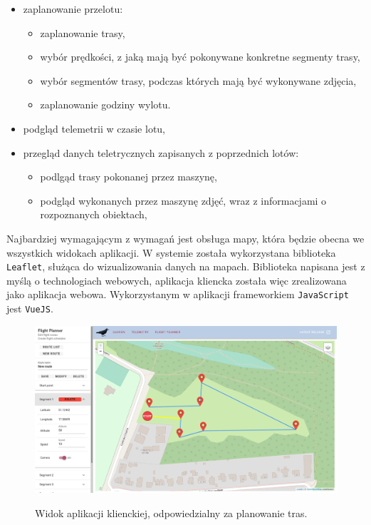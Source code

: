 \begin{itemize}
	\item zaplanowanie przelotu:
	\begin{itemize}
		\item zaplanowanie trasy,
		\item wybór prędkości, z jaką mają być pokonywane konkretne segmenty trasy,
		\item wybór segmentów trasy, podczas których mają być wykonywane zdjęcia,
		\item zaplanowanie godziny wylotu.
	\end{itemize}
	\item podgląd telemetrii w czasie lotu,
	\item przegląd danych teletrycznych zapisanych z poprzednich lotów:
	\begin{itemize}
		\item podlgąd trasy pokonanej przez maszynę,
		\item podgląd wykonanych przez maszynę zdjęć,
				wraz z informacjami o rozpoznanych obiektach,
	\end{itemize} 
\end{itemize}

Najbardziej wymagającym z wymagań jest obsługa mapy, która będzie obecna we wszystkich
widokach aplikacji. W systemie została wykorzystana biblioteka \texttt{Leaflet}, 
służąca do wizualizowania danych na mapach. Biblioteka napisana jest z myślą o technologiach 
webowych, aplikacja kliencka została więc zrealizowana jako aplikacja webowa.
Wykorzystanym w aplikacji frameworkiem \texttt{JavaScript} jest \texttt{VueJS}. 

\begin{figure}[H]
	\centering
	\caption{ Widok aplikacji klienckiej, odpowiedzialny za planowanie tras. }
\includegraphics[width=\linewidth]{rys03/flight_planner.png}
	\label{frontend_flight_planner}
\end{figure}


